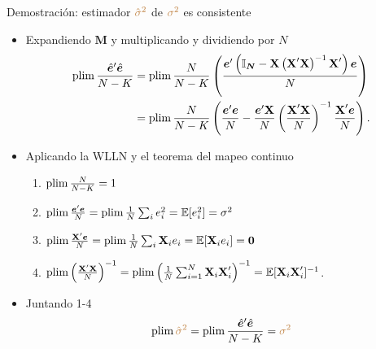 \documentclass[10pt, xcolor=dvipsnames]{beamer}
\begin{document}
\begin{frame}{Demostración: estimador $\textcolor{brown}{\hat{\sigma}^2}$ de $\textcolor{brown}{\sigma^2}$ es consistente}
\begin{itemize}
	\item Expandiendo $\textbf{M}$ y multiplicando y dividiendo por $N$
{\fontvid
\begin{align*}
\begin{split}
    \plim \frac{\hat{\boldsymbol{e}}'\hat{\boldsymbol{e}}}{N-K} &= \plim \frac{N}{N-K} \left(\frac{\boldsymbol{e}'\left(\boldsymbol{\mathbb{I}_N} - \XB \left(\XB' \XB \right)^{-1} \XB'\right)\boldsymbol{e}}{N}\right) \\
    &= \plim \frac{N}{N-K} \left(\dfrac{\boldsymbol{e}'\boldsymbol{e}}{N}-\dfrac{\boldsymbol{e}'\XB}{N}\left(\dfrac{\XB' \XB }{N}\right)^{-1}\dfrac{\XB'\boldsymbol{e}}{N}\right). \\
\end{split}
\end{align*}
}
\item Aplicando la WLLN y el teorema del mapeo continuo	
\begin{enumerate}
	\item $\plim \frac{N}{N-K} = 1$
	\item $\plim \frac{\boldsymbol{e}'\boldsymbol{e}}{N} = \plim \frac{1}{N} \sum_{i} e^2_i = \EX[e^2_i] = \sigma^2$
	\item $\plim \frac{\XB'\boldsymbol{e}}{N} = \plim \frac{1}{N} \sum_{i} \XB_i e_i =  \EX[\XB_i e_i] = \textbf{0}$			
	\item $\plim \left(\frac{\XB' \XB}{N}\right)^{-1} = \plim \left(\frac{1}{N}\sum_{i=1}^{N}\XB_i \XB'_i \right)^{-1} =  \EX[\XB_i \XB'_i]^{-1}$.				
\end{enumerate}
\vspace{0.2cm}
\item Juntando 1-4
\begin{align*}
\begin{split}
\plim  \brown{\hat{\sigma}^2} = \plim \frac{\hat{\boldsymbol{e}}'\hat{\boldsymbol{e}}}{N-K} = \brown{\sigma^2} 
\end{split}
\end{align*}
\end{itemize}
\hyperlink{DIAP:estVarCons}{{}}
\end{frame}


\end{document}
